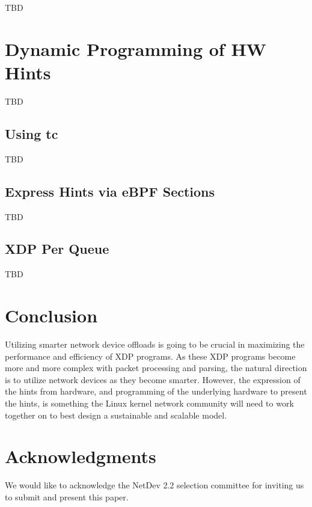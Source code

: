 \documentclass[letterpaper]{article}
\begin{document}
TBD

\section{Dynamic Programming of HW Hints}

TBD

\subsection{Using tc}

TBD

\subsection{Express Hints via eBPF Sections}

TBD

\subsection{XDP Per Queue}

TBD


\section{Conclusion}
Utilizing smarter network device offloads is going to be crucial in maximizing the performance and efficiency of XDP programs.  As these XDP programs become more and more complex with packet processing and parsing, the natural direction is to utilize network devices as they become smarter.  However, the expression of the hints from hardware, and programming of the underlying hardware to present the hints, is something the Linux kernel network community will need to work together on to best design a sustainable and scalable model.

\section{Acknowledgments}
We would like to acknowledge the NetDev 2.2 selection committee for inviting us to submit and present this paper.



\end{document}
